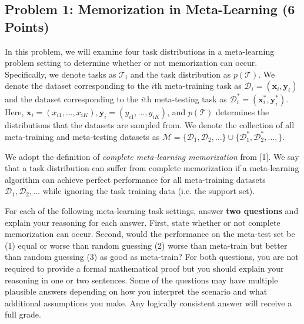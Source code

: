 \documentclass[12pt]{article}
\begin{document}
    \subsection*{Problem 1: Memorization in Meta-Learning (6 Points)}
    In this problem, we will examine four task distributions in a meta-learning problem setting to determine whether or not memorization can occur.
    Specifically, we denote tasks as $\mathcal{T}_i$ and the task distribution as $p(\mathcal{T})$.
    We denote the dataset corresponding to the $i$th meta-training task as $\mathcal{D}_i=\left(\boldsymbol{x}_i, \boldsymbol{y}_i\right)$ and the dataset corresponding to the $i$th meta-testing task as $\mathcal{D}_i^*=\left(\boldsymbol{x}_i^*, \boldsymbol{y}_i^*\right)$.
    Here, $\boldsymbol{x}_i=\left(x_{i 1}, \ldots, x_{i K}\right), \boldsymbol{y}_i=\left(y_{i 1}, \ldots, y_{i K}\right)$, and $p(\mathcal{T})$ determines the distributions that the datasets are sampled from.
    We denote the collection of all meta-training and meta-testing datasets as $\mathcal{M}=\{\mathcal{D}_1, \mathcal{D}_2, \ldots\} \cup \{\mathcal{D}_1^*, \mathcal{D}^*_2, \ldots, \}$.

    We adopt the definition of \textit{complete meta-learning memorization} from [1].
    We say that a task distribution can suffer from complete memorization if a meta-learning algorithm can achieve perfect performance for all meta-training datasets $\mathcal{D}_1, \mathcal{D}_2, \ldots$ while ignoring the task training data (i.e. the support set).

    For each of the following meta-learning task settings, answer \textbf{two questions} and explain your reasoning for each answer.
    First, state whether or not complete memorization can occur.
    Second, would the performance on the meta-test set be (1) equal or worse than random guessing (2) worse than meta-train but better than random guessing (3) as good as meta-train?
    For both questions, you are not required to provide a formal mathematical proof but you should explain your reasoning in one or two sentences.
    Some of the questions may have multiple plausible answers depending on how you interpret the scenario and what additional assumptions you make.
    Any logically consistent answer will receive a full grade.
\end{document}
